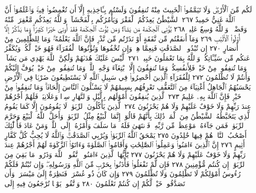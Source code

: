 لَكُم مِّنَ ٱلْأَرْضِۖ وَلَا تَيَمَّمُوا۟ ٱلْخَبِيثَ مِنْهُ تُنفِقُونَ
وَلَسْتُم بِـَٔاخِذِيهِ إِلَّآ أَن تُغْمِضُوا۟ فِيهِۚ وَٱعْلَمُوٓا۟ أَنَّ ٱللَّهَ غَنِيٌّ
حَمِيدٌ ٢٦٧ ٱلشَّيْطَٰنُ يَعِدُكُمُ ٱلْفَقْرَ وَيَأْمُرُكُم بِٱلْفَحْشَآءِۖ
وَٱللَّهُ يَعِدُكُم مَّغْفِرَةࣰ مِّنْهُ وَفَضْلࣰاۗ وَٱللَّهُ وَٰسِعٌ عَلِيمࣱ ٢٦٨
يُؤْتِي ٱلْحِكْمَةَ مَن يَشَآءُۚ وَمَن يُؤْتَ ٱلْحِكْمَةَ فَقَدْ
أُوتِيَ خَيْرࣰا كَثِيرࣰاۗ وَمَا يَذَّكَّرُ إِلَّآ أُو۟لُوا۟ ٱلْأَلْبَٰبِ ٢٦٩
وَمَآ أَنفَقْتُم مِّن نَّفَقَةٍ أَوْ نَذَرْتُم مِّن نَّذْرࣲ فَإِنَّ ٱللَّهَ
يَعْلَمُهُۥۗ وَمَا لِلظَّٰلِمِينَ مِنْ أَنصَارٍ ٢٧٠ إِن تُبْدُوا۟
ٱلصَّدَقَٰتِ فَنِعِمَّا هِيَۖ وَإِن تُخْفُوهَا وَتُؤْتُوهَا
ٱلْفُقَرَآءَ فَهُوَ خَيْرࣱ لَّكُمْۚ وَيُكَفِّرُ عَنكُم مِّن
سَيِّـَٔاتِكُمْۗ وَٱللَّهُ بِمَا تَعْمَلُونَ خَبِيرࣱ ٢٧١۞ لَّيْسَ
عَلَيْكَ هُدَىٰهُمْ وَلَٰكِنَّ ٱللَّهَ يَهْدِي مَن يَشَآءُۗ وَمَا
تُنفِقُوا۟ مِنْ خَيْرࣲ فَلِأَنفُسِكُمْۚ وَمَا تُنفِقُونَ إِلَّا
ٱبْتِغَآءَ وَجْهِ ٱللَّهِۚ وَمَا تُنفِقُوا۟ مِنْ خَيْرࣲ يُوَفَّ إِلَيْكُمْ
وَأَنتُمْ لَا تُظْلَمُونَ ٢٧٢ لِلْفُقَرَآءِ ٱلَّذِينَ أُحْصِرُوا۟
فِي سَبِيلِ ٱللَّهِ لَا يَسْتَطِيعُونَ ضَرْبࣰا فِي ٱلْأَرْضِ
يَحْسَبُهُمُ ٱلْجَاهِلُ أَغْنِيَآءَ مِنَ ٱلتَّعَفُّفِ تَعْرِفُهُم
بِسِيمَٰهُمْ لَا يَسْـَٔلُونَ ٱلنَّاسَ إِلْحَافࣰاۗ وَمَا تُنفِقُوا۟ مِنْ
خَيْرࣲ فَإِنَّ ٱللَّهَ بِهِۦ عَلِيمٌ ٢٧٣ ٱلَّذِينَ يُنفِقُونَ أَمْوَٰلَهُم
بِٱلَّيْلِ وَٱلنَّهَارِ سِرࣰّا وَعَلَانِيَةࣰ فَلَهُمْ أَجْرُهُمْ عِندَ
رَبِّهِمْ وَلَا خَوْفٌ عَلَيْهِمْ وَلَا هُمْ يَحْزَنُونَ ٢٧٤
ٱلَّذِينَ يَأْكُلُونَ ٱلرِّبَوٰا۟ لَا يَقُومُونَ إِلَّا كَمَا يَقُومُ ٱلَّذِي
يَتَخَبَّطُهُ ٱلشَّيْطَٰنُ مِنَ ٱلْمَسِّۚ ذَٰلِكَ بِأَنَّهُمْ قَالُوٓا۟ إِنَّمَا ٱلْبَيْعُ
مِثْلُ ٱلرِّبَوٰا۟ۗ وَأَحَلَّ ٱللَّهُ ٱلْبَيْعَ وَحَرَّمَ ٱلرِّبَوٰا۟ۚ فَمَن جَآءَهُۥ
مَوْعِظَةࣱ مِّن رَّبِّهِۦ فَٱنتَهَىٰ فَلَهُۥ مَا سَلَفَ وَأَمْرُهُۥٓ إِلَى ٱللَّهِۖ وَمَنْ
عَادَ فَأُو۟لَٰٓئِكَ أَصْحَٰبُ ٱلنَّارِۖ هُمْ فِيهَا خَٰلِدُونَ ٢٧٥ يَمْحَقُ
ٱللَّهُ ٱلرِّبَوٰا۟ وَيُرْبِي ٱلصَّدَقَٰتِۗ وَٱللَّهُ لَا يُحِبُّ كُلَّ كَفَّارٍ أَثِيمٍ ٢٧٦
إِنَّ ٱلَّذِينَ ءَامَنُوا۟ وَعَمِلُوا۟ ٱلصَّٰلِحَٰتِ وَأَقَامُوا۟ ٱلصَّلَوٰةَ
وَءَاتَوُا۟ ٱلزَّكَوٰةَ لَهُمْ أَجْرُهُمْ عِندَ رَبِّهِمْ وَلَا خَوْفٌ عَلَيْهِمْ
وَلَا هُمْ يَحْزَنُونَ ٢٧٧ يَٰٓأَيُّهَا ٱلَّذِينَ ءَامَنُوا۟ ٱتَّقُوا۟ ٱللَّهَ
وَذَرُوا۟ مَا بَقِيَ مِنَ ٱلرِّبَوٰٓا۟ إِن كُنتُم مُّؤْمِنِينَ ٢٧٨ فَإِن لَّمْ تَفْعَلُوا۟
فَأْذَنُوا۟ بِحَرْبࣲ مِّنَ ٱللَّهِ وَرَسُولِهِۦۖ وَإِن تُبْتُمْ فَلَكُمْ رُءُوسُ
أَمْوَٰلِكُمْ لَا تَظْلِمُونَ وَلَا تُظْلَمُونَ ٢٧٩ وَإِن كَانَ
ذُو عُسْرَةࣲ فَنَظِرَةٌ إِلَىٰ مَيْسَرَةࣲۚ وَأَن تَصَدَّقُوا۟ خَيْرࣱ لَّكُمْ
إِن كُنتُمْ تَعْلَمُونَ ٢٨٠ وَٱتَّقُوا۟ يَوْمࣰا تُرْجَعُونَ فِيهِ إِلَى

